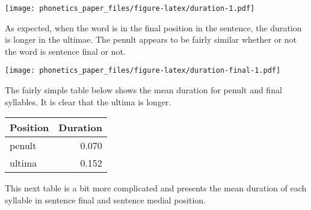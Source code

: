\documentclass[]{article}
\newenvironment{Shaded}{\begin{snugshade}}{\end{snugshade}}
\newcommand{\KeywordTok}[1]{\textcolor[rgb]{0.13,0.29,0.53}{\textbf{#1}}}
\newcommand{\DataTypeTok}[1]{\textcolor[rgb]{0.13,0.29,0.53}{#1}}
\newcommand{\DecValTok}[1]{\textcolor[rgb]{0.00,0.00,0.81}{#1}}
\newcommand{\StringTok}[1]{\textcolor[rgb]{0.31,0.60,0.02}{#1}}
\newcommand{\CommentTok}[1]{\textcolor[rgb]{0.56,0.35,0.01}{\textit{#1}}}
\newcommand{\OperatorTok}[1]{\textcolor[rgb]{0.81,0.36,0.00}{\textbf{#1}}}
\newcommand{\NormalTok}[1]{#1}
\begin{document}
\texttt{[image: phonetics\_paper\_files/figure-latex/duration-1.pdf]}

As expected, when the word is in the final position in the sentence, the
duration is longer in the ultimae. The penult appears to be fairly
similar whether or not the word is sentence final or not.

\begin{Shaded}
\end{Shaded}

\texttt{[image: phonetics\_paper\_files/figure-latex/duration-final-1.pdf]}

The fairly simple table below shows the mean duration for penult and
final syllables. It is clear that the ultima is longer.

\begin{Shaded}
\end{Shaded}

\begin{tabular}{l|r}
\hline
Position & Duration\\
\hline
penult & 0.070\\
\hline
ultima & 0.152\\
\hline
\end{tabular}

This next table is a bit more complicated and presents the mean duration
of each syllable in sentence final and sentence medial position.
\end{document}
